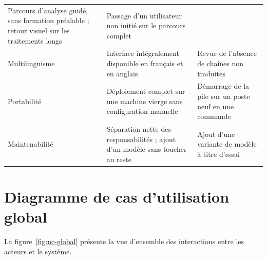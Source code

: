 \begin{longtable}{@{}L{2.7cm}L{6.1cm}L{6.0cm}@{}}
Parcours d'analyse guidé, sans formation préalable ; retour visuel sur les traitements
longs &
Passage d'un utilisateur non initié sur le parcours complet \\
\addlinespace[3pt]
Multilinguisme &
Interface intégralement disponible en français et en anglais &
Revue de l'absence de chaînes non traduites \\
\addlinespace[3pt]
Portabilité &
Déploiement complet sur une machine vierge sans configuration manuelle &
Démarrage de la pile sur un poste neuf en une commande \\
\addlinespace[3pt]
Maintenabilité &
Séparation nette des responsabilités ; ajout d'un modèle sans toucher au reste &
Ajout d'une variante de modèle à titre d'essai \\
\end{longtable}
\endgroup

\section{Diagramme de cas d'utilisation global}

La figure~\ref{fig:uc-global} présente la vue d'ensemble des interactions entre les
acteurs et le système.

